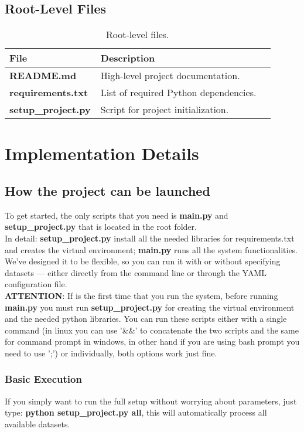 \documentclass[12pt,a4paper]{article}
\begin{document}
\subsection{Root-Level Files}

\begin{table}[H]
\centering
\renewcommand{\arraystretch}{1.2}
\begin{tabular}{p{0.25\linewidth} p{0.65\linewidth}}
\toprule
\textbf{File} & \textbf{Description} \\
\midrule
\textbf{README.md} & High-level project documentation. \\
\textbf{requirements.txt} & List of required Python dependencies. \\
\textbf{setup\_project.py} & Script for project initialization. \\
\bottomrule
\end{tabular}
\caption{Root-level files.}
\end{table}


\section{Implementation Details}

\subsection{How the project can be launched}
To get started, the only scripts that you need is \textbf{main.py} and \textbf{setup\_project.py} that is located in the root folder.
\\In detail:
\textbf{setup\_project.py} install all the needed libraries for requirements.txt and creates the virtual environment;
\textbf{main.py} runs all the system functionalities. We’ve designed it to be flexible, so you can run it with or without specifying datasets — either directly from the command line or through the YAML configuration file.
\\\textbf{ATTENTION}: If is the first time that you run the system, before running \textbf{main.py} you must run \textbf{setup\_project.py} for creating the virtual environment and the needed python libraries.
You can run these scripts either with a single command  (in linux you can use '\&\&' to concatenate the two scripts and the same for command prompt in windows, in other hand if you are using bash prompt you need to use ';') or individually, both options work just fine.
\subsubsection{Basic Execution}
If you simply want to run the full setup without worrying about parameters, just type: \textbf{python setup\_project.py all}, this will automatically process all available datasets.
\end{document}
